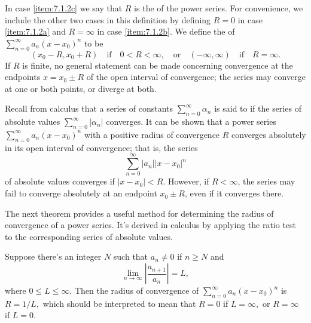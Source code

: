 \documentclass{ximera}
\begin{document}
In case \ref{item:7.1.2c} we say that $R$ is the  of
the power series. For convenience, we include the other two cases
in this definition by defining $R=0$ in case \ref{item:7.1.2a} and $R=\infty$ in
case \ref{item:7.1.2b}. We define the  of
$\sum_{n=0}^\infty a_n(x-x_0)^n$ to be
$$
 (x_0-R,x_0+R)\quad\mbox{if}\quad  0<R<\infty,\quad \mbox{or}\quad(-\infty,\infty) \quad\mbox{if}\quad R=\infty.
$$
If $R$ is finite, no general statement
can be made concerning convergence at the endpoints $x=x_0\pm R$ of
the open interval of convergence;   the series may converge at one or
both points, or diverge at both.


Recall from calculus that a series of constants
$\sum_{n=0}^\infty\alpha_n$ is said to  if
the series of absolute values $\sum_{n=0}^\infty|\alpha_n|$ converges.
It can be shown that a power series $\sum_{n=0}^\infty a_n(x-x_0)^n$
with a positive radius of convergence $R$ converges absolutely in its
open interval of convergence; that is, the series
$$
\sum_{n=0}^\infty |a_n||x-x_0|^n
$$
of absolute values  converges if $|x-x_0|<R$. However, if $R<\infty$,
the series may fail to converge absolutely at an endpoint $x_0\pm R$,
even if it converges there.

The next theorem provides a useful method for determining the
radius of convergence of a power series. It's derived in calculus by
applying the ratio test to the corresponding series of absolute
values. 

\begin{theorem}\label{thmtype:7.1.3}
Suppose there's an integer $N$ such that $a_n\ne0$ if
$n\geq N$ and
$$
\lim_{n\rightarrow\infty}\left|\frac{a_{n+1}}{a_n}\right|=L,
$$
where $0\leq L\leq \infty.$ Then the radius of convergence of
$\sum_{n=0}^\infty a_n(x-x_0)^n$ is $R=1/L,$ which should be interpreted
to mean that $R=0$ if $L=\infty,$ or $R=\infty$ if $L=0$.
\end{theorem}
\end{document}
